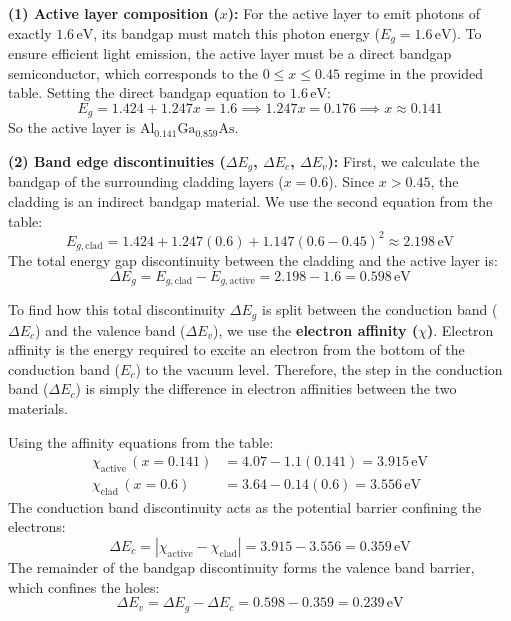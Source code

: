 \textbf{(1) Active layer composition ($x$):}
For the active layer to emit photons of exactly $1.6\,\text{eV}$, its bandgap must match this photon energy ($E_g = 1.6\,\text{eV}$). To ensure efficient light emission, the active layer must be a direct bandgap semiconductor, which corresponds to the $0 \le x \le 0.45$ regime in the provided table.
Setting the direct bandgap equation to $1.6\,\text{eV}$:
\begin{equation*}
  E_g = 1.424 + 1.247x = 1.6 \implies 1.247x = 0.176 \implies x \approx 0.141
\end{equation*}
So the active layer is $\text{Al}_{0.141}\text{Ga}_{0.859}\text{As}$.

\textbf{(2) Band edge discontinuities ($\Delta E_g$, $\Delta E_c$, $\Delta E_v$):}
First, we calculate the bandgap of the surrounding cladding layers ($x = 0.6$). Since $x > 0.45$, the cladding is an indirect bandgap material. We use the second equation from the table:
\begin{equation*}
  E_{g,\text{clad}} = 1.424 + 1.247(0.6) + 1.147(0.6 - 0.45)^2 \approx 2.198\,\text{eV}
\end{equation*}
The total energy gap discontinuity between the cladding and the active layer is:
\begin{equation*}
  \Delta E_g = E_{g,\text{clad}} - E_{g,\text{active}} = 2.198 - 1.6 = 0.598\,\text{eV}
\end{equation*}

To find how this total discontinuity $\Delta E_g$ is split between the conduction band ($\Delta E_c$) and the valence band ($\Delta E_v$), we use the \textbf{electron affinity ($\chi$)}. Electron affinity is the energy required to excite an electron from the bottom of the conduction band ($E_c$) to the vacuum level. Therefore, the step in the conduction band ($\Delta E_c$) is simply the difference in electron affinities between the two materials.

Using the affinity equations from the table:
\begin{align*}
  \chi_{\text{active}} \,(x = 0.141) &= 4.07 - 1.1(0.141) = 3.915\,\text{eV} \\
  \chi_{\text{clad}} \,(x = 0.6) &= 3.64 - 0.14(0.6) = 3.556\,\text{eV}
\end{align*}
The conduction band discontinuity acts as the potential barrier confining the electrons:
\begin{equation*}
  \Delta E_c = |\chi_{\text{active}} - \chi_{\text{clad}}| = 3.915 - 3.556 = 0.359\,\text{eV}
\end{equation*}
The remainder of the bandgap discontinuity forms the valence band barrier, which confines the holes:
\begin{equation*}
  \Delta E_v = \Delta E_g - \Delta E_c = 0.598 - 0.359 = 0.239\,\text{eV}
\end{equation*}

